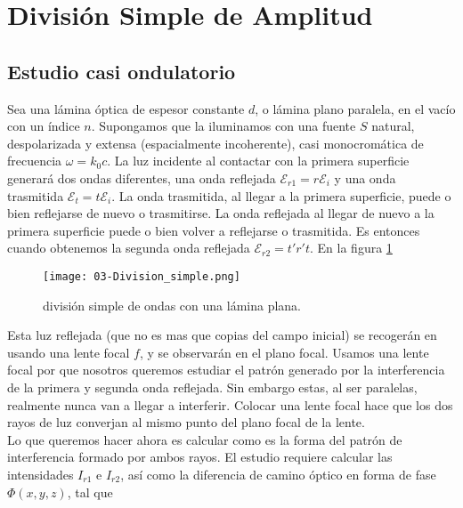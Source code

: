 \documentclass[12pt,a4paper]{book}
\numberwithin{equation}{section}
\numberwithin{figure}{section}
\newcommand{\1}{_{(1)}}
\newcommand{\2}{_{(2)}}
\newcommand{\Ecal}{\mathcal{E}}
\theoremstyle{definition}
\begin{document}
\section{División Simple de Amplitud }

\subsection{Estudio casi ondulatorio}



Sea una lámina óptica de espesor constante $d$, o lámina plano paralela, en el vacío con un índice $n$. Supongamos que la iluminamos con una fuente $S$ natural, despolarizada y extensa (espacialmente incoherente), casi monocromática de frecuencia $\omega = k_0 c$. La luz incidente al contactar con la primera superficie generará dos ondas diferentes, una onda reflejada $\Ecal_{r1} = r \Ecal_i$ y una onda trasmitida $\Ecal_{t}=t\Ecal_i$. La onda trasmitida, al llegar a la primera superficie, puede o bien reflejarse de nuevo o trasmitirse. La onda reflejada al llegar de nuevo a la primera superficie puede o bien volver a reflejarse o trasmitida. Es entonces cuando obtenemos la segunda onda reflejada $\Ecal_{r2} =t'r't$. En la figura \ref{Fig:03.1-01}

\begin{figure}[h!] \centering
\texttt{[image: 03-Division\_simple.png]}
\caption{división simple de ondas con una lámina plana.}
\label{Fig:03.1-01}
\end{figure}

Esta luz reflejada (que no es mas que copias del campo inicial) se recogerán en usando una lente focal $f$, y se observarán en el plano focal. Usamos una lente focal por que nosotros queremos estudiar el patrón generado por la interferencia de la primera y segunda onda reflejada. Sin embargo estas, al ser paralelas, realmente nunca van a llegar a interferir. Colocar una lente focal hace que los dos rayos de luz converjan al mismo punto del plano focal de la lente. \\

Lo que queremos hacer ahora es calcular como es la forma del patrón de interferencia formado por ambos rayos. El estudio requiere calcular las intensidades $I_{r1}$ e $I_{r2}$, así como la diferencia de camino óptico en forma de fase $\Phi (x,y,z)$, tal que
\end{document}
